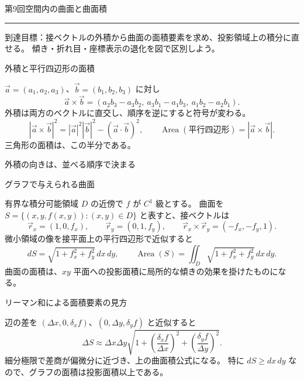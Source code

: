 \documentclass[a4paper,10pt,pdflatex,ja=standard,jafont=ipaex-type1,
  magstyle=real,scale=1]{bxjsarticle}
\newcommand{\handoutnumber}{9}
\newcommand{\handouttitle}[1]{%
  \begin{center}
    {\Large\color{ink}#1}\par\vspace{3mm}
    {\color{accent}\rule{0.88\linewidth}{0.7pt}}
  \end{center}\vspace{-2mm}}
\newcommand{\handout}[2]{%
  \renewcommand{\handoutnumber}{#1}%
  \handouttitle{第#1回\quad #2}}
\newcommand{\topic}[1]{\par\vspace{5pt}%
  {\large\sffamily\mdseries\color{accent}#1}\par\vspace{2pt}}
\newcommand{\keybox}[1]{\par\vspace{3pt}\begingroup
  \setlength{\fboxsep}{4pt}%
  \colorbox{soft}{\parbox{\dimexpr\linewidth-2\fboxsep\relax}{\small #1}}%
  \endgroup\par\vspace{2pt}}
\begin{document}
\fontsize{10pt}{13.5pt}\selectfont
\setlength{\abovedisplayskip}{4pt}
\setlength{\belowdisplayskip}{4pt}
\handout{9}{空間内の曲面と曲面積}
\keybox{到達目標：接ベクトルの外積から曲面の面積要素を求め、投影領域上の積分に直せる。
傾き・折れ目・座標表示の退化を図で区別しよう。}

\topic{外積と平行四辺形の面積}
$\vec a=(a_1,a_2,a_3)$、$\vec b=(b_1,b_2,b_3)$ に対し
$$
 \vec a\times\vec b=
 (a_2b_3-a_3b_2,\ a_3b_1-a_1b_3,\ a_1b_2-a_2b_1).
$$
外積は両方のベクトルに直交し、順序を逆にすると符号が変わる。
$$
 |\vec a\times\vec b|^2=|\vec a|^2|\vec b|^2-(\vec a\cdot\vec b)^2,
 \qquad
 \operatorname{Area}(\text{平行四辺形})=|\vec a\times\vec b|.
$$
三角形の面積は、この半分である。


\par\vspace{2pt}\noindent
\begin{minipage}[b]{0.98\linewidth}\centering
{}\par
{\small\color{muted}外積の向きは、並べる順序で決まる}\par
\end{minipage}
\par\vspace{2pt}

\topic{グラフで与えられる曲面}
有界な積分可能領域 $D$ の近傍で $f$ が $C^1$ 級とする。
曲面を $S=\{(x,y,f(x,y)):(x,y)\in D\}$ と表すと、接ベクトルは
$$
 \vec r_x=(1,0,f_x),\qquad \vec r_y=(0,1,f_y),\qquad
 \vec r_x\times\vec r_y=(-f_x,-f_y,1).
$$
微小領域の像を接平面上の平行四辺形で近似すると
$$
 dS=\sqrt{1+f_x^2+f_y^2}\,dx\,dy,\qquad
 \operatorname{Area}(S)=\iint_D\sqrt{1+f_x^2+f_y^2}\,dx\,dy.
$$
曲面の面積は、$xy$ 平面への投影面積に局所的な傾きの効果を掛けたものになる。


\topic{リーマン和による面積要素の見方}
辺の差を $(\Delta x,0,\delta_x f)$、$(0,\Delta y,\delta_y f)$ と近似すると
$$
 \Delta S\approx\Delta x\Delta y
 \sqrt{1+\left(\frac{\delta_xf}{\Delta x}\right)^2
          +\left(\frac{\delta_yf}{\Delta y}\right)^2}.
$$
細分極限で差商が偏微分に近づき、上の曲面積公式になる。
特に $dS\ge dx\,dy$ なので、グラフの面積は投影面積以上である。
\end{document}
